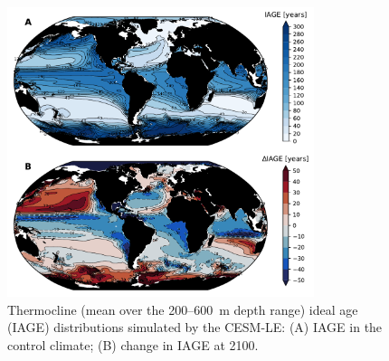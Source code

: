 \documentclass[draft,linenumbers]{report_chapter}
\begin{document}
\begin{figure}[tbp]
\centering
\includegraphics[width=0.8\textwidth]{cesm-thermocline-iage-change.pdf}
\caption{Thermocline (mean over the 200--600~m depth range) ideal age (IAGE) distributions simulated by the CESM-LE: (A) IAGE in the control climate; (B) change in IAGE at 2100.}
\label{fig:cesm-thermocline-iage-change}
\end{figure}
\end{document}
